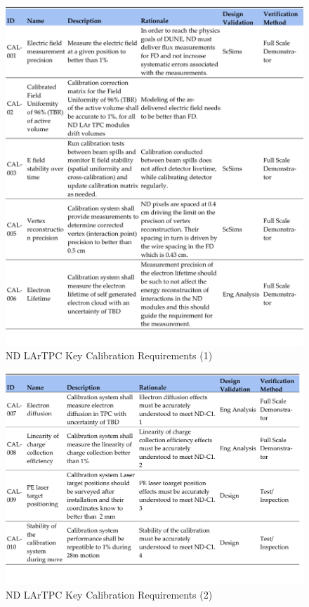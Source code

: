 \begin{figure}
\centering 
\includegraphics[width=1\linewidth]{graphics/lartpc/0Req/NDCalreqs1.pdf}
\caption{\label{fig:lartpc_cal_req1} ND LArTPC Key Calibration Requirements (1)}
\end{figure}

\begin{figure}
\centering 
\includegraphics[width=1\linewidth]{graphics/lartpc/0Req/NDCalreqs2.pdf}
\caption{\label{fig:lartpc_cal_req1} ND LArTPC Key Calibration Requirements (2)}
\end{figure}

